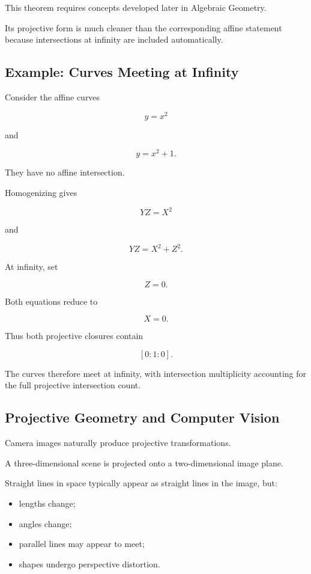 This theorem requires concepts developed later in Algebraic Geometry.

Its projective form is much cleaner than the corresponding affine statement
because intersections at infinity are included automatically.

\subsection{Example: Curves Meeting at Infinity}
\label{subsec:curves-meeting-infinity}

Consider the affine curves

\[
y=x^2
\]

and

\[
y=x^2+1.
\]

They have no affine intersection.

Homogenizing gives

\[
YZ=X^2
\]

and

\[
YZ=X^2+Z^2.
\]

At infinity, set

\[
Z=0.
\]

Both equations reduce to

\[
X=0.
\]

Thus both projective closures contain

\[
\boxed{[0:1:0].}
\]

The curves therefore meet at infinity, with intersection multiplicity
accounting for the full projective intersection count.

\subsection{Projective Geometry and Computer Vision}
\label{subsec:projective-computer-vision}

Camera images naturally produce projective transformations.

A three-dimensional scene is projected onto a two-dimensional image plane.

Straight lines in space typically appear as straight lines in the image, but:

\begin{itemize}
    \item lengths change;
    \item angles change;
    \item parallel lines may appear to meet;
    \item shapes undergo perspective distortion.
\end{itemize}

